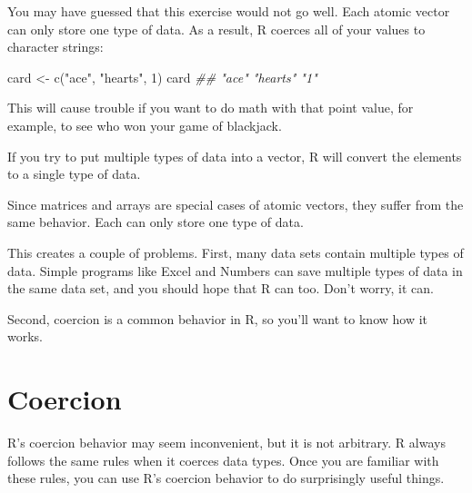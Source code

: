 \documentclass[
  letterpaper,
  DIV=11,
  numbers=noendperiod]{scrbook}
\newenvironment{Shaded}{\begin{snugshade}}{\end{snugshade}}
\newcommand{\DecValTok}[1]{\textcolor[rgb]{0.68,0.00,0.00}{#1}}
\newcommand{\DocumentationTok}[1]{\textcolor[rgb]{0.37,0.37,0.37}{\textit{#1}}}
\newcommand{\FunctionTok}[1]{\textcolor[rgb]{0.28,0.35,0.67}{#1}}
\newcommand{\NormalTok}[1]{\textcolor[rgb]{0.00,0.23,0.31}{#1}}
\newcommand{\OtherTok}[1]{\textcolor[rgb]{0.00,0.23,0.31}{#1}}
\newcommand{\StringTok}[1]{\textcolor[rgb]{0.13,0.47,0.30}{#1}}
\begin{document}
You may have guessed that this exercise would not go well. Each atomic
vector can only store one type of data. As a result, R coerces all of
your values to character strings:

\begin{Shaded}
\begin{Highlighting}[]
\NormalTok{card }\OtherTok{\textless{}{-}} \FunctionTok{c}\NormalTok{(}\StringTok{"ace"}\NormalTok{, }\StringTok{"hearts"}\NormalTok{, }\DecValTok{1}\NormalTok{)}
\NormalTok{card}
\DocumentationTok{\#\# "ace"    "hearts" "1" }
\end{Highlighting}
\end{Shaded}

This will cause trouble if you want to do math with that point value,
for example, to see who won your game of blackjack.

\begin{tcolorbox}[enhanced jigsaw, breakable, colback=white, colbacktitle=quarto-callout-warning-color!10!white, arc=.35mm, bottomrule=.15mm, coltitle=black, left=2mm, rightrule=.15mm, colframe=quarto-callout-warning-color-frame, leftrule=.75mm, opacitybacktitle=0.6, bottomtitle=1mm, toptitle=1mm, titlerule=0mm, opacityback=0, title=\textcolor{quarto-callout-warning-color}{\faExclamationTriangle}\hspace{0.5em}{Data types in vectors}, toprule=.15mm]

If you try to put multiple types of data into a vector, R will convert
the elements to a single type of data.

\end{tcolorbox}

Since matrices and arrays are special cases of atomic vectors, they
suffer from the same behavior. Each can only store one type of data.

This creates a couple of problems. First, many data sets contain
multiple types of data. Simple programs like Excel and Numbers can save
multiple types of data in the same data set, and you should hope that R
can too. Don't worry, it can.

Second, coercion is a common behavior in R, so you'll want to know how
it works.

\section{Coercion}\label{coercion}

R's coercion behavior may seem inconvenient, but it is not arbitrary. R
always follows the same rules when it coerces data types. Once you are
familiar with these rules, you can use R's coercion behavior to do
surprisingly useful things.
\end{document}
